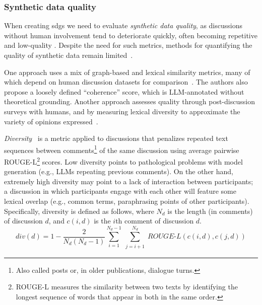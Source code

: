\subsubsection{Synthetic data quality}
\label{sec:related:quality:diversity}

When creating \acp{sdg} we need to evaluate \emph{synthetic data quality}, as discussions without human involvement tend to deteriorate quickly, often becoming repetitive and low-quality \cite{ulmer2024}. Despite the need for such metrics, methods for quantifying the quality of synthetic data remain limited~\cite{ulmer2024}. 

One approach uses a mix of graph-based and lexical similarity metrics, many of which depend on human discussion datasets for comparison~\cite{balog_2024}. The authors also propose a loosely defined ``coherence'' score, which is LLM-annotated without theoretical grounding. Another approach assesses quality through post-discussion surveys with humans, and by measuring lexical diversity to approximate the variety of opinions expressed~\cite{kim_et_al_chatbot}. 

\emph{Diversity}~\cite{ulmer2024} is a metric applied to discussions that penalizes repeated text sequences between comments\footnote{Also called posts or, in older publications, dialogue turns.} of the same discussion using average pairwise ROUGE-L\footnote{ROUGE-L measures the similarity between two texts by identifying the longest sequence of words that appear in both in the same order.} \cite{lin-2004-rouge} scores. Low diversity points to pathological problems with model generation (e.g., LLMs repeating previous comments). On the other hand, extremely high diversity may point to a lack of interaction between participants; a discussion in which participants engage with each other will feature some lexical overlap (e.g., common terms, paraphrasing points of other participants). Specifically, diversity is defined as follows, where $N_d$ is the length (in comments) of discussion $d$, and $c(i, d)$ is the $i$th comment of discussion $d$. 
\[
\textit{div}(d) = 1 - \frac{2}{N_d(N_d-1)}\sum_{i=1}^{N_d-1} \sum_{\substack{j=i+1}}^{N_d} \textit{ROUGE-L}(c(i,d), c(j,d))
\]

